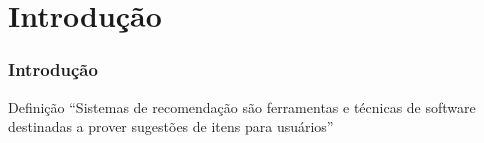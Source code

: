\section[Introdução]{Introdução}
\begin{frame}
\frametitle{Introdução}
\begin{block}{Definição}
``Sistemas de recomendação são ferramentas e técnicas de software destinadas a prover sugestões de itens para usuários'' \cite{ricci2011introduction-chap1}
\end{block}
\end{frame}
